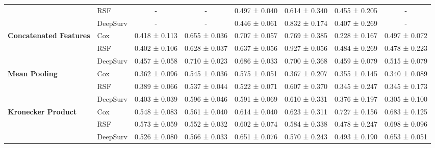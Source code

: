 \begin{sidewaystable}[htbp]
\begin{tabular}{@{}llcccccc@{}}
        & RSF & - & - & 0.497 ± 0.040 & 0.614 ± 0.340 & 0.455 ± 0.205 & - \\
        & DeepSurv & - & - & 0.446 ± 0.061 & 0.832 ± 0.174 & 0.407 ± 0.269 & - \\
        \midrule
        \multirow{3}{*}{\textbf{Concatenated Features}} & Cox & 0.418 ± 0.113 & 0.655 ± 0.036 & 0.707 ± 0.057 & 0.769 ± 0.385 & 0.228 ± 0.167 & 0.497 ± 0.072 \\
        & RSF & 0.402 ± 0.106 & 0.628 ± 0.037 & 0.637 ± 0.056 & 0.927 ± 0.056 & 0.484 ± 0.269 & 0.478 ± 0.223 \\
        & DeepSurv & 0.457 ± 0.058 & 0.710 ± 0.023 & 0.686 ± 0.033 & 0.700 ± 0.368 & 0.459 ± 0.079 & 0.515 ± 0.079 \\
        \midrule
        \multirow{3}{*}{\textbf{Mean Pooling}} & Cox & 0.362 ± 0.096 & 0.545 ± 0.036 & 0.575 ± 0.051 & 0.367 ± 0.207 & 0.355 ± 0.145 & 0.340 ± 0.089 \\
        & RSF & 0.389 ± 0.066 & 0.537 ± 0.044 & 0.522 ± 0.071 & 0.607 ± 0.370 & 0.345 ± 0.247 & 0.345 ± 0.173 \\
        & DeepSurv & 0.403 ± 0.039 & 0.596 ± 0.046 & 0.591 ± 0.069 & 0.610 ± 0.331 & 0.376 ± 0.197 & 0.305 ± 0.100 \\
        \midrule
        \multirow{3}{*}{\textbf{Kronecker Product}} & Cox & 0.548 ± 0.083 & 0.561 ± 0.040 & 0.614 ± 0.040 & 0.623 ± 0.311 & 0.727 ± 0.156 & 0.683 ± 0.125 \\
        & RSF & 0.573 ± 0.059 & 0.552 ± 0.032 & 0.602 ± 0.074 & 0.584 ± 0.338 & 0.478 ± 0.247 & 0.698 ± 0.096 \\
        & DeepSurv & 0.526 ± 0.080 & 0.566 ± 0.033 & 0.651 ± 0.076 & 0.570 ± 0.243 & 0.493 ± 0.190 & 0.653 ± 0.051 \\
        \bottomrule
    \end{tabular}
\end{sidewaystable}